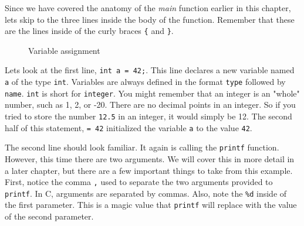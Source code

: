 \documentclass[12pt]{article}
\newcommand{\ident}[1]{{\it\ttfamily #1}}
\begin{document}
Since we have covered the anatomy of the \ident{main} function earlier in this
chapter, lets skip to the three lines inside the body of the function. Remember
that these are the lines inside of the curly braces \verb|{| and \verb|}|.

\begin{figure}
	\centering
	
	\caption{Variable assignment}
\end{figure}

Lets look at the first line, \verb|int a = 42;|. This line declares a new
variable named \verb|a| of the type \verb|int|. Variables are always
defined in the format \verb|type| followed by \verb|name|. \verb|int| is short
for \verb|integer|.  You might remember that an integer is an "whole" number,
such as 1, 2, or -20.  There are no decimal points in an integer. So if you
tried to store the number \verb|12.5| in an integer, it would simply be 12. The
second half of this statement, \verb|= 42| initialized the variable
\verb|a| to the value \verb|42|.

The second line should look familiar. It again is calling the \verb|printf|
function. However, this time there are two arguments. We will cover this in
more detail in a later chapter, but there are a few important things to take
from this example. First, notice the comma \verb|,| used to separate the
two arguments provided to \verb|printf|. In C, arguments are separated by
commas. Also, note the \verb|%d| inside of the first parameter. This is a
magic value that \verb|printf| will replace with the value of the second
parameter.
\end{document}
